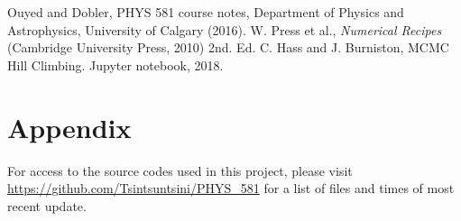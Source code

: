 \documentclass[twocolumn]{article}
\begin{document}
\begin{thebibliography}{00}
	Ouyed and Dobler, PHYS 581 course notes, Department of Physics and Astrophysics, University of Calgary (2016).
	W. Press et al., \emph{Numerical Recipes} (Cambridge University Press, 2010) 2nd. Ed.
	C. Hass and J. Burniston, MCMC Hill Climbing. Jupyter notebook, 2018.
\end{thebibliography}

\section{Appendix}
For access to the source codes used in this project, please visit \url{https://github.com/Tsintsuntsini/PHYS_581} for a list of files and times of most recent update.
	
\end{document}
